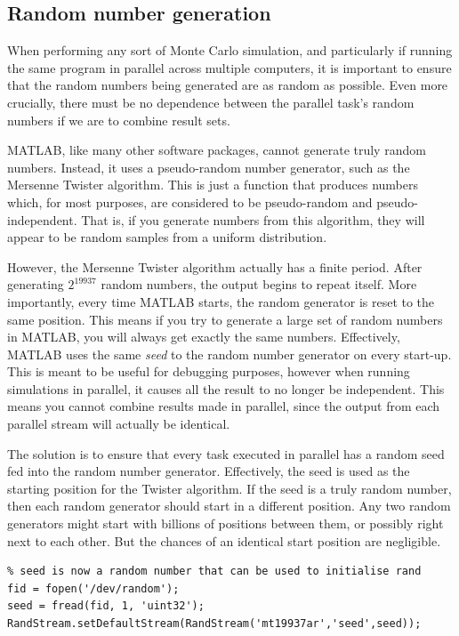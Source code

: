 \documentclass[11pt]{article}
\numberwithin{equation}{subsection}
\begin{document}
\subsection{Random number generation}
When performing any sort of Monte Carlo simulation, and particularly if running the same program in parallel across multiple computers, it is important to ensure that the random numbers being generated are as random as possible. Even more crucially, there must be no dependence between the parallel task's random numbers if we are to combine result sets.

MATLAB, like many other software packages, cannot generate truly random numbers. Instead, it uses a pseudo-random number generator, such as the Mersenne Twister algorithm. This is just a function that produces numbers which, for most purposes, are considered to be pseudo-random and pseudo-independent. That is, if you generate numbers from this algorithm, they will appear to be random samples from a uniform distribution. 

However, the Mersenne Twister algorithm actually has a finite period. After generating $2^{19937}$ random numbers, the output begins to repeat itself. More importantly, every time MATLAB starts, the random generator is reset to the same position. This means if you try to generate a large set of random numbers in MATLAB, you will always get exactly the same numbers. Effectively, MATLAB uses the same \textit{seed} to the random number generator on every start-up. This is meant to be useful for debugging purposes, however when running simulations in parallel, it causes all the result to no longer be independent. This means you cannot combine results made in parallel, since the output from each parallel stream will actually be identical.

The solution is to ensure that every task executed in parallel has a random seed fed into the random number generator. Effectively, the seed is used as the starting position for the Twister algorithm. If the seed is a truly random number, then each random generator should start in a different position. Any two random generators might start with billions of positions between them, or possibly right next to each other. But the chances of an identical start position are negligible.

\begin{lstlisting}[float=ht,style=Matlab-editor,caption = {Seeding random generator},label=code:rng]
% Ensures truly random numbers for each process
% seed is now a random number that can be used to initialise rand
fid = fopen('/dev/random');
seed = fread(fid, 1, 'uint32');
RandStream.setDefaultStream(RandStream('mt19937ar','seed',seed));
\end{lstlisting}
\end{document}
